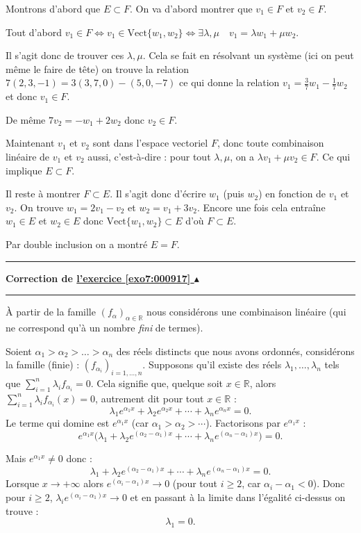 \documentclass[11pt,a4paper]{article}
\newcommand{\Rr}{\mathbb{R}} \newcommand{\R}{\mathbb{R}}
\renewcommand{\ge}{\geqslant} \renewcommand{\geq}{\geqslant}
\newcounter{exo}
\newcommand{\correction}[1]{\hypertarget{cor7:#1}{}\label{cor7:#1}{\bf Correction de \hyperlink{exo7:#1}{l'exercice \ref{exo7:#1} $\blacktriangle$}}\vspace{1mm}\hrule\vspace{1mm}}
\newcommand{\fincorrection}{\vspace{1mm}\hrule\vspace*{7mm}}
\begin{document}
Montrons d'abord que $E \subset F$.
On va d'abord montrer que $v_1 \in F$ et $v_2 \in F$.

Tout d'abord 
$v_1\in F \iff v_1 \in \text{Vect}\{w_1,w_2\} \iff \exists \lambda, \mu \quad v_1 = \lambda w_1+\mu w_2 $.

Il s'agit donc de trouver ces $\lambda,\mu$. Cela se fait en résolvant un système
(ici on peut même le faire de tête) on trouve la relation 
$7 (2, 3, -1) = 3(3, 7, 0)-(5, 0, -7)$
ce qui donne la relation $v_1 = \frac37 w_1 -\frac 17 w_2$ et donc $v_1\in F$.

De même $7v_2=-w_1+2w_2$ donc $v_2\in F$.

Maintenant $v_1$ et $v_2$ sont dans l'espace vectoriel $F$, donc toute combinaison linéaire
de $v_1$ et $v_2$ aussi, c'est-à-dire : pour tout $\lambda,\mu$, on a $\lambda v_1+\mu v_2 \in F$.
Ce qui implique $E \subset F$.


\bigskip

Il reste à montrer $F\subset E$. Il s'agit donc d'écrire $w_1$ (puis $w_2$) en fonction de $v_1$ et $v_2$.
On trouve $w_1= 2v_1-v_2$ et $w_2=v_1+3v_2$. Encore une fois cela entraîne $w_1 \in E$ et $w_2 \in E$ donc
$\text{Vect}\{w_1,w_2\} \subset E$ d'où $F\subset E$.

Par double inclusion on a montré $E=F$. 

\fincorrection
\correction{000917}
  \`A partir de la famille $(f_\alpha)_{\alpha\in \Rr}$ nous
  consid\'erons une combinaison lin\'eaire (qui ne correspond qu'\`a un
  nombre \emph{fini} de termes).

  
  Soient $\alpha_1 > \alpha_2 > \ldots > \alpha_n$ des r\'eels distincts que nous avons ordonnés, consid\'erons la
  famille (finie) : $(f_{\alpha_i})_{i=1,\ldots,n}$. Supposons qu'il
  existe des r\'eels $\lambda_1,\ldots, \lambda_n$ tels que
  $\sum_{i=1}^n \lambda_i f_{\alpha_i}=0$. Cela signifie que, quelque
  soit $x \in \Rr$, alors $\sum_{i=1}^n \lambda_i f_{\alpha_i}(x) = 0$,
autrement dit pour tout $x\in \Rr$ :
$$\lambda_1 e^{\alpha_1 x} + \lambda_2 e^{\alpha_2 x} + \cdots + \lambda_n e^{\alpha_n x}=0.$$
Le terme qui domine est $e^{\alpha_1 x}$ (car $\alpha_1>\alpha_2>\cdots$).
Factorisons par $e^{\alpha_1 x}$ :
$$e^{\alpha_1 x} \Big( \lambda_1  + \lambda_2 e^{(\alpha_2-\alpha_1) x} + \cdots 
+ \lambda_n e^{(\alpha_n-\alpha_1) x} \Big) =0.$$

Mais $e^{\alpha_1 x}\neq 0$ donc :
$$\lambda_1  + \lambda_2 e^{(\alpha_2-\alpha_1) x} + \cdots 
+ \lambda_n e^{(\alpha_n-\alpha_1) x} =0.$$
Lorsque $x\to +\infty$ alors $e^{(\alpha_i-\alpha_1) x} \to 0$ 
(pour tout $i\ge 2$, car $\alpha_i-\alpha_1<0$).
Donc pour $i\ge 2$, $\lambda_i e^{(\alpha_i-\alpha_1) x} \to 0$ et
en passant à la limite dans l'égalité ci-dessus on trouve :
$$\lambda_1=0.$$
\end{document}
